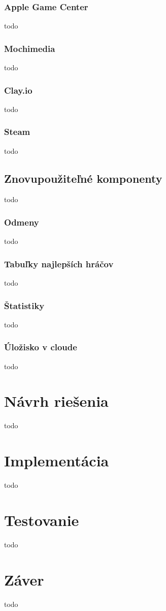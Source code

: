 \subsection{Apple Game Center}
todo

\subsection{Mochimedia}
todo

\subsection{Clay.io}
todo

\subsection{Steam}
todo

\section{Znovupoužiteľné komponenty}
todo

\subsection{Odmeny}
todo

\subsection{Tabuľky najlepších hráčov}
todo

\subsection{Štatistiky}
todo

\subsection{Úložisko v cloude}
todo

\chapter{Návrh riešenia}
todo

\chapter{Implementácia}
todo

\chapter{Testovanie}
todo

\chapter{Záver}
todo












